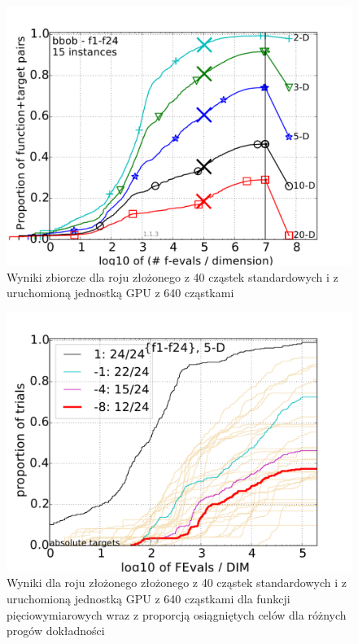 \documentclass[12pt, twoside, openany, abstract=on]{report}
\theoremstyle{definition}
\begin{document}
\begin{figure}[H]
    \centering
    \includegraphics[scale=.75]{charts/1node40stGPU.pdf} 
 \caption{Wyniki zbiorcze dla roju złożonego z 40 cząstek standardowych i z uruchomioną jednostką GPU z 640 cząstkami}
\end{figure}

\begin{figure}[H]
    \centering
    \includegraphics[scale=.75]{charts/1node40stGPU_5D.pdf} 
 \caption{Wyniki dla roju złożonego złożonego z 40 cząstek standardowych i z uruchomioną jednostką GPU z 640 cząstkami dla funkcji pięciowymiarowych wraz z proporcją osiągniętych celów dla różnych progów dokładności}
\end{figure}
\end{document}
